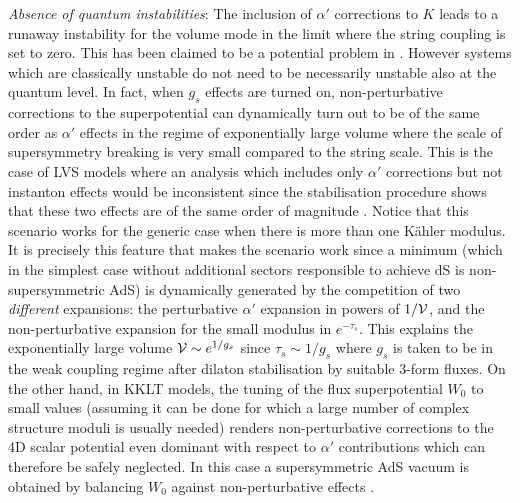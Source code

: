 \documentclass[11pt,a4paper]{article}
\newcommand{\vo}{\mathcal{V}}
\def\vo{{{\cal{V}}}}
\begin{document}
\item \emph{Absence of quantum instabilities}: The inclusion of $\alpha'$ corrections to $K$ leads to a runaway instability for the volume mode in the limit where the string coupling is set to zero. This has been claimed to be a potential problem in \cite{Sethi:2017phn}. However systems which are classically unstable do not need to be necessarily unstable also at the quantum level. In fact, when $g_s$ effects are turned on, non-perturbative corrections to the superpotential can dynamically turn out to be of the same order as $\alpha'$ effects in the regime of exponentially large volume where the scale of supersymmetry breaking is very small compared to the string scale. This is the case of LVS models where an analysis which includes only $\alpha'$ corrections but not instanton effects would be inconsistent since the stabilisation procedure shows that these two effects are of the same order of magnitude \cite{Balasubramanian:2005zx, Conlon:2005ki, Cicoli:2008va}. Notice that this scenario works for the generic case when there is more than one K\"ahler modulus. It is precisely this feature that makes the scenario work since a minimum (which in the simplest case without additional sectors responsible to achieve dS is non-supersymmetric AdS) is dynamically generated by the competition of two \textit{different} expansions: the perturbative $\alpha'$ expansion in powers of $1/\vo$, and the non-perturbative expansion for the small modulus in $e^{-\tau_s}$. This explains the exponentially large volume $\vo\sim e^{1/g_s}$ since $\tau_s\sim 1/g_s$ where $g_s$ is taken to be in the weak coupling regime after dilaton stabilisation by suitable 3-form fluxes. On the other hand, in KKLT models, the tuning of the flux superpotential $W_0$ to small values (assuming it can be done for which a large number of complex structure moduli is usually needed) renders non-perturbative corrections to the 4D scalar potential even dominant with respect to $\alpha'$ contributions which can therefore be safely neglected. In this case a supersymmetric AdS vacuum is obtained by balancing $W_0$ against non-perturbative effects \cite{Kachru:2003aw}.
\end{document}
